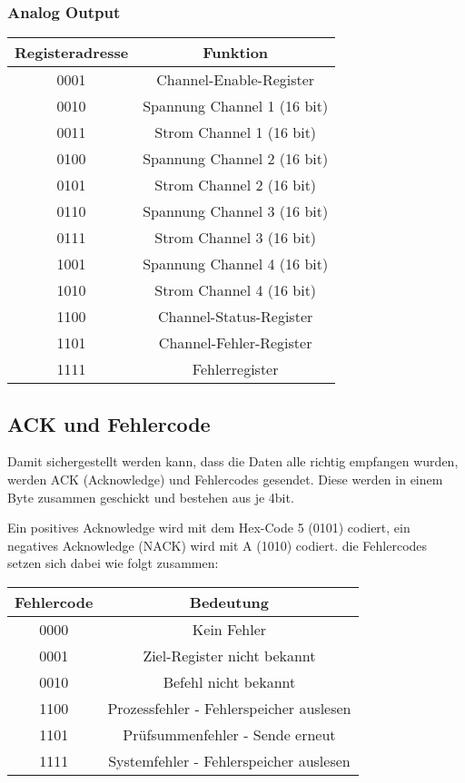 \subsubsection{Analog Output}
\begin{table}[H]
    \centering
        \begin{tabular}{|c|c|}
            \hline
            Registeradresse & Funktion \\ \hline \hline
            0001 & Channel-Enable-Register \\ \hline
            0010 & Spannung Channel 1 (16 bit) \\ \hline
            0011 & Strom Channel 1 (16 bit)\\ \hline
            0100 & Spannung Channel 2 (16 bit)\\ \hline
            0101 & Strom Channel 2 (16 bit)\\ \hline
            0110 & Spannung Channel 3 (16 bit)\\ \hline
            0111 & Strom Channel 3 (16 bit)\\ \hline
            1001 & Spannung Channel 4 (16 bit)\\ \hline
            1010 & Strom Channel 4 (16 bit)\\ \hline
            1100 & Channel-Status-Register \\ \hline
            1101 & Channel-Fehler-Register \\ \hline
            1111 & Fehlerregister \\ \hline
        \end{tabular}
\end{table}

\subsection{ACK und Fehlercode}
Damit sichergestellt werden kann, dass die Daten alle richtig empfangen wurden, werden ACK (Acknowledge) und Fehlercodes gesendet. Diese werden in einem Byte zusammen geschickt und bestehen aus je 4bit.

Ein positives Acknowledge wird mit dem Hex-Code 5 (0101) codiert, ein negatives Acknowledge (NACK) wird mit A (1010) codiert. die Fehlercodes setzen sich dabei wie folgt zusammen:

\begin{table}[H]
    \centering
        \begin{tabular}{|c|c|}
            \hline
            Fehlercode & Bedeutung \\ \hline \hline
            0000 & Kein Fehler \\ \hline
            0001 & Ziel-Register nicht bekannt \\ \hline
            0010 & Befehl nicht bekannt \\ \hline
            1100 & Prozessfehler - Fehlerspeicher auslesen \\ \hline
            1101 & Prüfsummenfehler - Sende erneut \\ \hline
            1111 & Systemfehler - Fehlerspeicher auslesen \\ \hline
        \end{tabular}
\end{table}